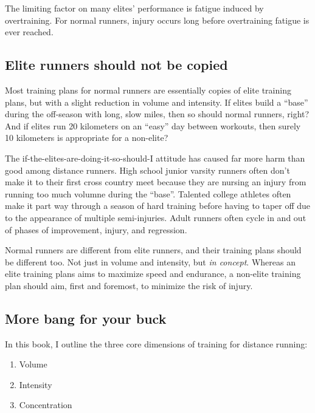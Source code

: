 \documentclass[]{tufte-handout}
\providecommand{\tightlist}{%
  \setlength{\itemsep}{0pt}\setlength{\parskip}{0pt}}
\begin{document}
The limiting factor on many elites' performance is fatigue induced by
overtraining. For normal runners, injury occurs long before overtraining
fatigue is ever reached.

\subsection{Elite runners should not be
copied}\label{elite-runners-should-not-be-copied}

Most training plans for normal runners are essentially copies of elite
training plans, but with a slight reduction in volume and intensity. If
elites build a ``base'' during the off-season with long, slow miles,
then so should normal runners, right? And if elites run 20 kilometers on
an ``easy'' day between workouts, then surely 10 kilometers is
appropriate for a non-elite?

The if-the-elites-are-doing-it-so-should-I attitude has caused far more
harm than good among distance runners. High school junior varsity
runners often don't make it to their first cross country meet because
they are nursing an injury from running too much volumne during the
``base''. Talented college athletes often make it part way through a
season of hard training before having to taper off due to the appearance
of multiple semi-injuries. Adult runners often cycle in and out of
phases of improvement, injury, and regression.

Normal runners are different from elite runners, and their training
plans should be different too. Not just in volume and intensity, but
\emph{in concept}. Whereas an elite training plans aims to maximize
speed and endurance, a non-elite training plan should aim, first and
foremost, to minimize the risk of injury.

\subsection{More bang for your buck}\label{more-bang-for-your-buck}

In this book, I outline the three core dimensions of training for
distance running:

\begin{enumerate}
\def\labelenumi{\arabic{enumi}.}
\tightlist
\item
  Volume
\item
  Intensity
\item
  Concentration
\end{enumerate}
\end{document}
